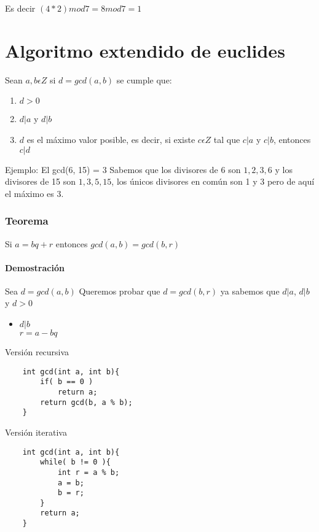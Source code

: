 Es decir $(4 * 2) mod 7 = 8 mod 7 = 1$ \newline



\section{Algoritmo extendido de euclides}

Sean $a,b \epsilon Z$ si $d = gcd(a, b)$ se cumple que:
\begin{enumerate}
    \item $d > 0$
    \item $d|a$ y $d|b$
    \item $d$ es el máximo valor posible, es decir, si existe $c \epsilon Z$ tal que $c|a$ y $c|b$, entonces $c|d$
\end{enumerate}

Ejemplo: \newline
El gcd(6, 15) = 3 \newline
Sabemos que los divisores de 6 son ${1, 2, 3, 6}$ y los divisores de 15 son ${1, 3, 5, 15}$, los únicos divisores en común son 1 y 3 pero de aquí el máximo es 3.

\subsubsection{Teorema}
Si $a = bq + r$ entonces $gcd(a, b) = gcd(b, r)$ \newline
\paragraph{Demostración}
Sea $d = gcd(a, b)$ Queremos probar que $d = gcd(b, r)$ ya sabemos que $d|a$, $d|b$ y $d > 0$ \newline
\begin{itemize}
    \item {$d|b$ \\ $r = a - bq$ }
\end{itemize}

Versión recursiva
\begin{lstlisting}
    int gcd(int a, int b){
        if( b == 0 )
            return a;
        return gcd(b, a % b);
    }
\end{lstlisting}

Versión iterativa 
\begin{lstlisting}
    int gcd(int a, int b){
        while( b != 0 ){
            int r = a % b;
            a = b;
            b = r;
        }
        return a;
    }
\end{lstlisting}

